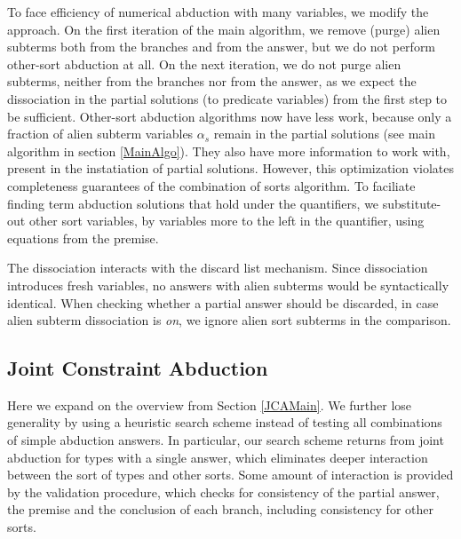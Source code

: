 \documentclass{article}
\newcommand{\tmem}[1]{{\em #1\/}}
\begin{document}
To face efficiency of numerical abduction with many variables, we modify the
approach. On the first iteration of the main algorithm, we remove (purge)
alien subterms both from the branches and from the answer, but we do not
perform other-sort abduction at all. On the next iteration, we do not purge
alien subterms, neither from the branches nor from the answer, as we expect
the dissociation in the partial solutions (to predicate variables) from the
first step to be sufficient. Other-sort abduction algorithms now have less
work, because only a fraction of alien subterm variables $\alpha_s$ remain in
the partial solutions (see main algorithm in section \ref{MainAlgo}). They
also have more information to work with, present in the instatiation of
partial solutions. However, this optimization violates completeness guarantees
of the combination of sorts algorithm. To faciliate finding term abduction
solutions that hold under the quantifiers, we substitute-out other sort
variables, by variables more to the left in the quantifier, using equations
from the premise.

The dissociation interacts with the discard list mechanism. Since dissociation
introduces fresh variables, no answers with alien subterms would be
syntactically identical. When checking whether a partial answer should be
discarded, in case alien subterm dissociation is {\tmem{on}}, we ignore alien
sort subterms in the comparison.

\subsection{Joint Constraint Abduction}\label{JCAAlg}

Here we expand on the overview from Section \ref{JCAMain}. We further lose
generality by using a heuristic search scheme instead of testing all
combinations of simple abduction answers. In particular, our search scheme
returns from joint abduction for types with a single answer, which eliminates
deeper interaction between the sort of types and other sorts. Some amount of
interaction is provided by the validation procedure, which checks for
consistency of the partial answer, the premise and the conclusion of each
branch, including consistency for other sorts.
\end{document}

